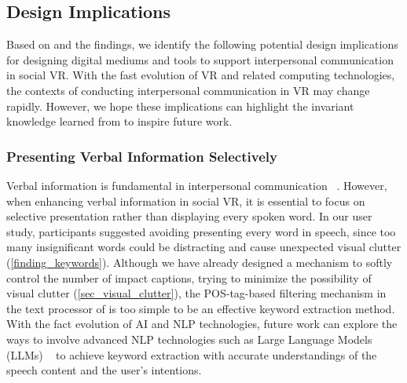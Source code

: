 \subsection{Design Implications}
Based on \system{} and the findings, we identify the following potential design implications for designing digital mediums and tools to support interpersonal communication in social VR.
With the fast evolution of VR and related computing technologies, the contexts of conducting interpersonal communication in VR may change rapidly. However, we hope these implications can highlight the invariant knowledge learned from \system{} to inspire future work.

\subsubsection{Presenting Verbal Information Selectively}
Verbal information is fundamental in interpersonal communication ~\cite{liu2023visual}. However, when enhancing verbal information in social VR, it is essential to focus on selective presentation rather than displaying every spoken word.
In our user study, participants suggested avoiding presenting every word in speech, since too many insignificant words could be distracting and cause unexpected visual clutter (\autoref{finding_keywords}). 
Although we have already designed a mechanism to softly control the number of impact captions, trying to minimize the possibility of visual clutter (\autoref{sec_visual_clutter}), the POS-tag-based filtering mechanism in the text processor of \system{} is too simple to be an effective keyword extraction method.
With the fact evolution of AI and NLP technologies, future work can explore the ways to involve advanced NLP technologies such as Large Language Models (LLMs) ~\cite{maragheh2023llm} to achieve keyword extraction with accurate understandings of the speech content and the user's intentions.



